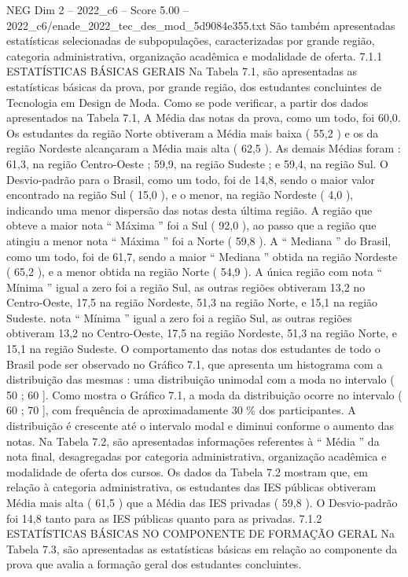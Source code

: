 \begin{textsample}{NEG Dim 2 – 2022\_c6 – Score 5.00 – 2022\_c6/enade\_2022\_tec\_des\_mod\_5d9084e355.txt}
São também apresentadas estatísticas selecionadas de subpopulações, caracterizadas por grande região, categoria administrativa, organização acadêmica e modalidade de oferta. 7.1.1 ESTATÍSTICAS BÁSICAS GERAIS Na Tabela 7.1, são apresentadas as estatísticas básicas da prova, por grande região, dos estudantes concluintes de Tecnologia em Design de Moda.
Como se pode verificar, a partir dos dados apresentados na Tabela 7.1, A Média das notas da prova, como um todo, foi 60,0.
Os estudantes da região Norte obtiveram a Média mais baixa ( 55,2 ) e os da região Nordeste alcançaram a Média mais alta ( 62,5 ).
As demais Médias foram : 61,3, na região Centro-Oeste ; 59,9, na região Sudeste ; e 59,4, na região Sul.
O Desvio-padrão para o Brasil, como um todo, foi de 14,8, sendo o maior valor encontrado na região Sul ( 15,0 ), e o menor, na região Nordeste ( 4,0 ), indicando uma menor dispersão das notas desta última região.
A região que obteve a maior nota “ Máxima ” foi a Sul ( 92,0 ), ao passo que a região que atingiu a menor nota “ Máxima ” foi a Norte ( 59,8 ).
A “ Mediana ” do Brasil, como um todo, foi de 61,7, sendo a maior “ Mediana ” obtida na região Nordeste ( 65,2 ), e a menor obtida na região Norte ( 54,9 ).
A única região com nota “ Mínima ” igual a zero foi a região Sul, as outras regiões obtiveram 13,2 no Centro-Oeste, 17,5 na região Nordeste, 51,3 na região Norte, e 15,1 na região Sudeste. nota “ Mínima ” igual a zero foi a região Sul, as outras regiões obtiveram 13,2 no Centro-Oeste, 17,5 na região Nordeste, 51,3 na região Norte, e 15,1 na região Sudeste.
O comportamento das notas dos estudantes de todo o Brasil pode ser observado no Gráfico 7.1, que apresenta um histograma com a distribuição das mesmas : uma distribuição unimodal com a moda no intervalo ( 50 ; 60 ].
Como mostra o Gráfico 7.1, a moda da distribuição ocorre no intervalo ( 60 ; 70 ], com frequência de aproximadamente 30 \% dos participantes.
A distribuição é crescente até o intervalo modal e diminui conforme o aumento das notas.
Na Tabela 7.2, são apresentadas informações referentes à “ Média ” da nota final, desagregadas por categoria administrativa, organização acadêmica e modalidade de oferta dos cursos.
Os dados da Tabela 7.2 mostram que, em relação à categoria administrativa, os estudantes das IES públicas obtiveram Média mais alta ( 61,5 ) que a Média das IES privadas ( 59,8 ).
O Desvio-padrão foi 14,8 tanto para as IES públicas quanto para as privadas. 7.1.2 ESTATÍSTICAS BÁSICAS NO COMPONENTE DE FORMAÇÃO GERAL Na Tabela 7.3, são apresentadas as estatísticas básicas em relação ao componente da prova que avalia a formação geral dos estudantes concluintes.

\end{textsample}
